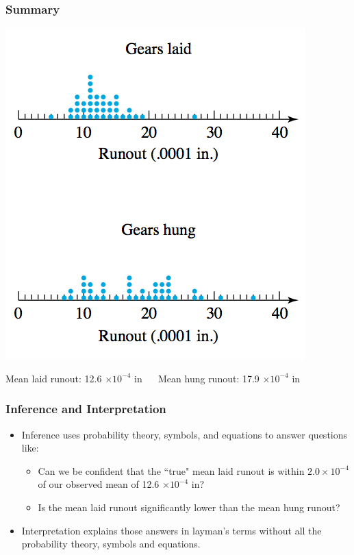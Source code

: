 \documentclass[handout]{beamer}
\providecommand{\q}{$\quad$ \newline}
\numberwithin{equation}{section}
\begin{document}
\begin{frame}
\frametitle{Summary}
\begin{center}
 \includegraphics{../../fig/gearsdot.png} 
\end{center}

Mean laid runout: 12.6 $\times 10^{-4}$ in \q
Mean hung runout: 17.9  $\times 10^{-4}$ in
\end{frame}


\begin{frame}
\frametitle{Inference and Interpretation}
\begin{itemize}
\item Inference uses probability theory, symbols, and equations to answer questions like:
\begin{itemize}
\item Can we be confident that the ``true" mean laid runout is within $2.0 \times 10^{-4}$ of our observed mean of 12.6 $\times 10^{-4}$ in? \pause
\item Is the mean laid runout significantly lower than the mean hung runout? 
\end{itemize} \pause
\item Interpretation explains those answers in layman's terms without all the probability theory, symbols and equations.
\end{itemize}
\end{frame}
\end{document}

